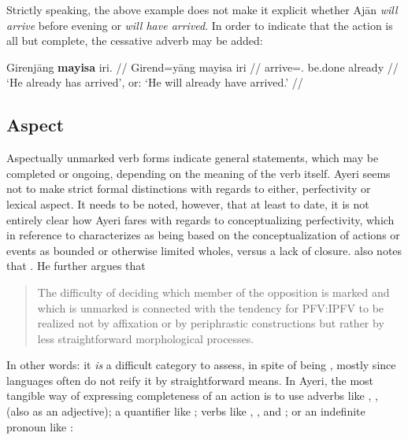 Strictly speaking, the above example does not make it explicit whether Ajān 
\emph{will arrive} before evening or \emph{will have arrived}. In order to 
indicate that the action is all but complete, the cessative adverb 
 may be added:

\ex
\begingl
	\gla Girenjāng \textbf{mayisa} iri. //
	\glb Girend=yāng mayisa iri //
	\glc arrive=\TsgM{}.\Aarg{} be.done already //
	\glft `He already has arrived', or: `He will already have arrived.' //
\endgl
\xe



\subsection{Aspect}
\label{subsec:aspect}

Aspectually unmarked verb forms indicate general statements, which may be
completed or ongoing, depending on the meaning of the verb itself. Ayeri seems
not to make strict formal distinctions with regards to either, perfectivity or
lexical aspect. It needs to be noted, however, that at least to date, it is not
entirely clear how Ayeri fares with regards to conceptualizing perfectivity,
which \citet[76]{dahl1985} in reference to
\citet[16]{comrie1976} characterizes as being based on the conceptualization of
actions or events as bounded or otherwise limited wholes, versus a lack of
closure. \citeauthor{dahl1985} also notes that . He further argues that

\blockcquote[73]{dahl1985}{The difficulty of deciding which member of the 
opposition is marked and which is unmarked is connected with the tendency for 
PFV:IPFV to be realized not by affixation or by periphrastic constructions but 
rather by less straightforward morphological processes.}

In other words: it \emph{is} a difficult category to assess, in spite of being
,
mostly since languages often do not reify it by straightforward means. In
Ayeri, the most tangible way of expressing completeness of an action is to use
adverbs like , ,
 (also as an adjective); a quantifier like
; verbs like ,
, and ; or an indefinite
pronoun like :

